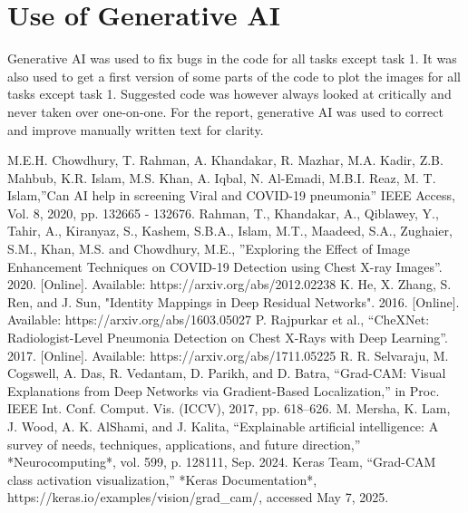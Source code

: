 \documentclass[conference]{IEEEtran}
\begin{document}
\section{Use of Generative AI}\label{sec:generative_AI}
Generative AI was used to fix bugs in the code for all tasks except task 1. It was also used to get a first version of some parts of the code to plot the images for all tasks except task 1. Suggested code was however always looked at critically and never taken over one-on-one. For the report, generative AI was used to correct and improve manually written text for clarity.


\begin{thebibliography}{00}
 M.E.H. Chowdhury, T. Rahman, A. Khandakar, R. Mazhar, M.A. Kadir, Z.B. Mahbub, K.R. Islam, M.S. Khan, A. Iqbal, N. Al-Emadi, M.B.I. Reaz, M. T. Islam,''Can AI help in screening Viral and COVID-19 pneumonia'' IEEE Access, Vol. 8, 2020, pp. 132665 - 132676.
 Rahman, T., Khandakar, A., Qiblawey, Y., Tahir, A., Kiranyaz, S., Kashem, S.B.A., Islam, M.T., Maadeed, S.A., Zughaier, S.M., Khan, M.S. and Chowdhury, M.E., ''Exploring the Effect of Image Enhancement Techniques on COVID-19 Detection using Chest X-ray Images''. 2020. [Online]. Available: https://arxiv.org/abs/2012.02238
 K. He, X. Zhang, S. Ren, and J. Sun, "Identity Mappings in Deep Residual Networks". 2016. [Online]. Available: https://arxiv.org/abs/1603.05027
 P. Rajpurkar et al., ``CheXNet: Radiologist-Level Pneumonia Detection on Chest X-Rays with Deep Learning''. 2017. [Online]. Available: https://arxiv.org/abs/1711.05225
 R. R. Selvaraju, M. Cogswell, A. Das, R. Vedantam, D. Parikh, and D. Batra, ``Grad-CAM: Visual Explanations from Deep Networks via Gradient-Based Localization,'' in Proc. IEEE Int. Conf. Comput. Vis. (ICCV), 2017, pp. 618--626.
 M. Mersha, K. Lam, J. Wood, A. K. AlShami, and J. Kalita, ``Explainable artificial intelligence: A survey of needs, techniques, applications, and future direction,'' *Neurocomputing*, vol. 599, p. 128111, Sep. 2024.
 Keras Team, ``Grad-CAM class activation visualization,'' *Keras Documentation*, https://keras.io/examples/vision/grad\_cam/, accessed May 7, 2025.
\end{thebibliography}
\end{document}
